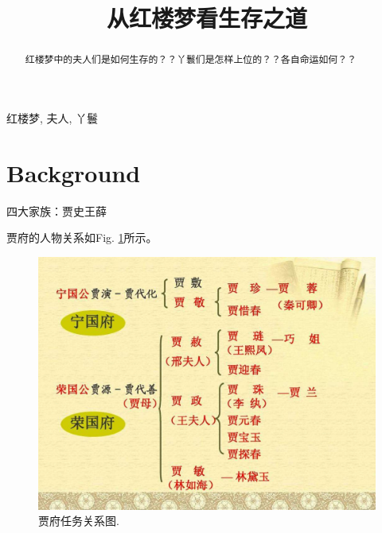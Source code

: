 \documentclass[conference]{IEEEtran}
\begin{document}
	\begin{CJK*}{UTF8}{song}
		
	
	

\title{  从红楼梦看生存之道   \\
}

\author{
	
	 
}

\maketitle

\begin{abstract}
红楼梦中的夫人们是如何生存的？？丫鬟们是怎样上位的？？各自命运如何？？
\end{abstract}

\begin{IEEEkeywords}
红楼梦, 夫人, 丫鬟
\end{IEEEkeywords}

\section{Background}
四大家族：贾史王薛

贾府的人物关系如Fig. \ref{jia_fu_structure}所示。
\begin{figure}[htbp]
	\centering
	\includegraphics[scale=0.2]{jia_fu_structure.jpg}
	\caption{贾府任务关系图.}
	\label{jia_fu_structure}
\end{figure}




\end{CJK*}
\end{document}
